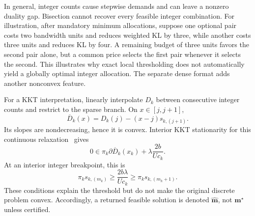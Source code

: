 In general, integer counts cause stepwise demands and can leave a nonzero duality gap. Bisection cannot recover every feasible integer combination. For illustration, after mandatory minimum allocations, suppose one optional pair costs two bandwidth units and reduces weighted KL by three, while another costs three units and reduces KL by four. A remaining budget of three units favors the second pair alone, but a common price selects the first pair whenever it selects the second. This illustrates why exact local thresholding does not automatically yield a globally optimal integer allocation. The separate dense format adds another nonconvex feature.

For a KKT interpretation, linearly interpolate $D_k$ between consecutive integer counts and restrict to the sparse branch. On $x\in[j,j+1]$,
\begin{equation}
 \overline D_k(x)=D_k(j)-(x-j)s_{k,(j+1)}.
 \label{eq:interpolation}
\end{equation}
Its slopes are nondecreasing, hence it is convex. Interior KKT stationarity for this continuous relaxation~\cite[Sec.~5.5]{boyd} gives
\begin{equation}
 0\in\pi_k\partial\overline D_k(x_k)+\lambda\frac{2b}{Uc_k}.
 \label{eq:kkt}
\end{equation}
At an interior integer breakpoint, this is
\begin{equation}
 \pi_ks_{k,(m_k)}\ge\frac{2b\lambda}{Uc_k}
 \ge\pi_ks_{k,(m_k+1)}.
 \label{eq:kkt-threshold}
\end{equation}
These conditions explain the threshold but do not make the original discrete problem convex. Accordingly, a returned feasible solution is denoted $\widehat{\mathbf m}$, not $\mathbf m^\star$ unless certified.

